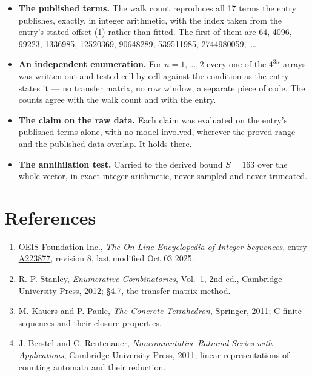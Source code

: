 \documentclass[11pt]{article}
\theoremstyle{definition}
\begin{document}
\begin{itemize}

\item {\bfseries The published terms.} The walk count reproduces all 17 terms the entry publishes, exactly, in integer arithmetic, with the index taken from the entry's stated offset (1) rather than fitted. The first of them are 64, 4096, 99223, 1336985, 12520369, 90648289, 539511985, 2744980059,~\dots

\item {\bfseries An independent enumeration.} For $n = 1,\dots,2$ every one of the $4^{3n}$ arrays was written out and tested cell by cell against the condition as the entry states it --- no transfer matrix, no row window, a separate piece of code. The counts agree with the walk count and with the entry.

\item {\bfseries The claim on the raw data.} Each claim was evaluated on the entry's published terms alone, with no model involved, wherever the proved range and the published data overlap. It holds there.

\item {\bfseries The annihilation test.} Carried to the derived bound $S = 163$ over the whole vector, in exact integer arithmetic, never sampled and never truncated.

\end{itemize}

\section{References}

\begin{enumerate}

\item OEIS Foundation Inc., \emph{The On-Line Encyclopedia of Integer Sequences}, entry \href{https://oeis.org/A223877}{A223877}, revision 8, last modified Oct 03 2025.

\item R. P. Stanley, \emph{Enumerative Combinatorics}, Vol.~1, 2nd ed., Cambridge University Press, 2012; \S4.7, the transfer-matrix method.

\item M. Kauers and P. Paule, \emph{The Concrete Tetrahedron}, Springer, 2011; C-finite sequences and their closure properties.

\item J. Berstel and C. Reutenauer, \emph{Noncommutative Rational Series with Applications}, Cambridge University Press, 2011; linear representations of counting automata and their reduction.

\end{enumerate}
\end{document}
